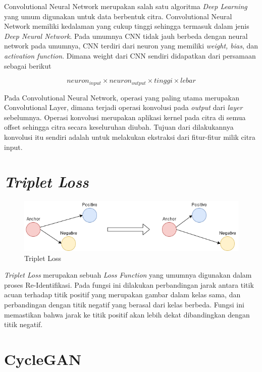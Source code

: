 Convolutional Neural Network merupakan salah satu algoritma \textit{Deep Learning} yang umum digunakan untuk data berbentuk citra. Convolutional Neural Network memiliki kedalaman yang cukup tinggi sehingga termasuk dalam jenis \textit{Deep Neural Network}. Pada umumnya CNN tidak jauh berbeda dengan neural network pada umumnya, CNN terdiri dari neuron yang memiliki \textit{weight, bias}, dan \textit{activation function}. Dimana weight dari CNN sendiri didapatkan dari persamaan sebagai berikut

\[neuron_{input} \times neuron_{output} \times tinggi \times lebar\] 

Pada Convolutional Neural Network, operasi yang paling utama merupakan Convolutional Layer, dimana terjadi operasi konvolusi pada \textit{output} dari \textit{layer} sebelumnya. Operasi konvolusi merupakan aplikasi kernel pada citra di semua offset sehingga citra secara keseluruhan diubah. Tujuan dari dilakukannya konvolusi itu sendiri adalah untuk melakukan ekstraksi dari fitur-fitur milik citra input.

\section{\textit{Triplet Loss}}
\vspace{1ex}

\begin{figure}[h!]
	\centering
	\includegraphics[scale=0.4]{img/TripletLoss.png}
	\caption{Triplet Loss}
	\label{fig:Triplet}
\end{figure}

\par \textit{Triplet Loss} merupakan sebuah \textit{Loss Function} yang umumnya digunakan dalam proses Re-Identifikasi. Pada fungsi ini dilakukan perbandingan jarak antara titik acuan terhadap titik positif yang merupakan gambar dalam kelas sama, dan perbandingan dengan titik negatif yang berasal dari kelas berbeda. Fungsi ini memastikan bahwa jarak ke titik positif akan lebih dekat dibandingkan dengan titik negatif.

\section{CycleGAN}
\vspace{1ex}

